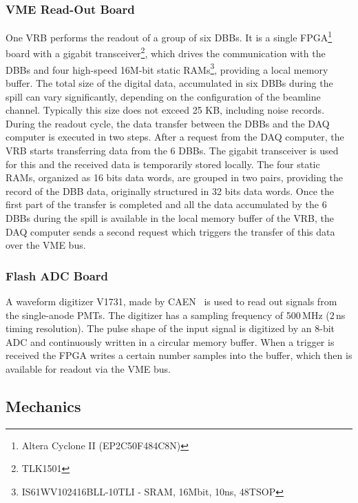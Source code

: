 \documentclass[a4paper,11pt]{article}
\begin{document}
\subsubsection{VME Read-Out Board}\label{electronics:subsec:vme_readout_board}

One VRB performs the readout of a group of six DBBs. It is a single FPGA\footnote{Altera Cyclone II (EP2C50F484C8N)} board with a gigabit 
transceiver\footnote{TLK1501}, which drives the communication with the DBBs and four high-speed 16M-bit static RAMs\footnote{IS61WV102416BLL-10TLI
- SRAM, 16Mbit, 10ns, 48TSOP}, providing a local memory buffer. The total size of the digital data, accumulated in six DBBs during the spill can vary
significantly, depending on the configuration of the beamline channel. Typically this size does not exceed 25 KB, including noise records. During the
readout cycle, the data transfer between the DBBs and the DAQ computer is executed in two steps. After a request from the DAQ computer, the VRB starts
transferring data from the 6 DBBs. The gigabit transceiver is used for this and the received data is temporarily stored locally. The four static RAMs,
organized as 16 bits data words, are grouped in two pairs, providing the record of the DBB data, originally structured in 32 bits data words. Once the
first part of the transfer is completed and all the data accumulated by the 6 DBBs during the spill is available in the local memory buffer of the VRB,
the DAQ computer sends a second request which triggers the transfer of this data over the VME bus.

\subsubsection{Flash ADC Board}\label{electronics:subsec:fast_adc_board}

A waveform digitizer V1731, made by CAEN~\cite{V1731} is used to read out signals from the single-anode PMTs. The digitizer has a sampling frequency
of 500\,MHz (2\,ns timing resolution). The pulse shape of the input signal is digitized by an 8-bit ADC and continuously written in a circular memory
buffer. When a trigger is received the FPGA writes a certain number samples into the buffer, which then is available for readout via the VME bus.

\subsection{Mechanics}\label{design:subsec:mechanics}
\end{document}
